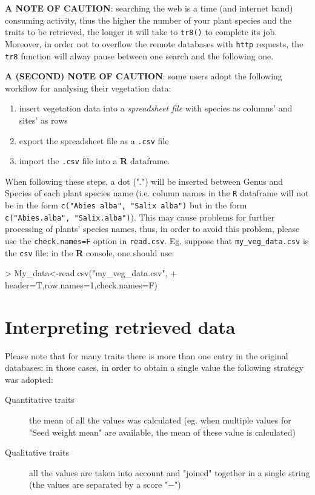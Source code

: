 \documentclass{article}
\begin{document}
  
  \textbf{A NOTE OF CAUTION}: searching the web is a time (and
  internet band) consuming activity, thus the higher the number of
  your plant species and the traits to be retrieved, the longer it will take to \texttt{tr8()} to complete its job. Moreover, in order
  not to overflow the remote databases with \texttt{http} requests, the \texttt{tr8} function will alway pause between one search and the following one.

  \textbf{A (SECOND) NOTE OF CAUTION}: some users adopt the following workflow for analysing their vegetation data:

  \begin{enumerate}
  \item insert vegetation data into a \textit{spreadsheet file} with species as
  columns' and sites' as rows
\item export the spreadsheet file as a \texttt{.csv} file
\item import the \texttt{.csv} file into a \textbf{R} dataframe.
  \end{enumerate}
  
  When following these steps, a dot (".") will be inserted between
Genus and Species of each plant species name (i.e. column names in the
\texttt{R} dataframe will not be in the form \texttt{c("Abies alba", "Salix
alba")} but in the form  \texttt{c("Abies.alba", "Salix.alba")}).
This may cause problems for further processing of plants'
species names, thus, in order to avoid this problem, please use the \texttt{check.names=F}
  option in \texttt{read.csv}. Eg. suppose that
  \texttt{my\_veg\_data.csv} is the \texttt{csv} file: in the
  \textbf{R} console, one should use:

\begin{Schunk}
\begin{Sinput}
> My_data<-read.csv("my_veg_data.csv",
+                   header=T,row.names=1,check.names=F)
\end{Sinput}
\end{Schunk}


\section{Interpreting retrieved data}
\label{sec:interpreting}

Please note that for many traits there is more than one entry in the
original databases: in those cases, in order to obtain a single value
the following strategy was adopted:

\begin{description}
\item[Quantitative traits] the mean of all the values was calculated
  (eg. when multiple values for "Seed weight mean" are available, the
  mean of these value is calculated)
\item[Qualitative traits] all the values are taken into account and
  "joined" together in a single string (the values are separated by a
  score "$-$")
\end{description}
\end{document}
